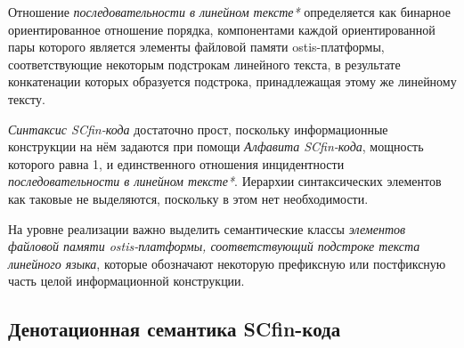 \begin{SCn}
\end{SCn}

Отношение \textit{последовательности в линейном тексте*} определяется как бинарное ориентированное отношение порядка, компонентами каждой ориентированной пары которого является элементы файловой памяти ostis-платформы, соответствующие некоторым подстрокам линейного текста, в результате конкатенации которых образуется подстрока, принадлежащая этому же линейному тексту.

\textit{Синтаксис SCfin-кода} достаточно прост, поскольку информационные конструкции на нём задаются при помощи \textit{Алфавита SCfin-кода}, мощность которого равна 1, и единственного отношения инцидентности \textit{последовательности в линейном тексте*}. Иерархии синтаксических элементов как таковые не выделяются, поскольку в этом нет необходимости.

На уровне реализации важно выделить семантические классы \textit{элементов файловой памяти ostis-платформы, соответствующий подстроке текста линейного языка}, которые обозначают некоторую префиксную или постфиксную часть целой информационной конструкции.

\subsection{Денотационная семантика SCfin-кода}
\label{sec_soft_platform_scfin_code_semantic}

\begin{SCn}
\begin{scnsubstruct}

\begin{scnindent}
    \begin{scneqtoset}
    \end{scneqtoset}
\end{scnindent}

\end{scnsubstruct}
\end{SCn}

